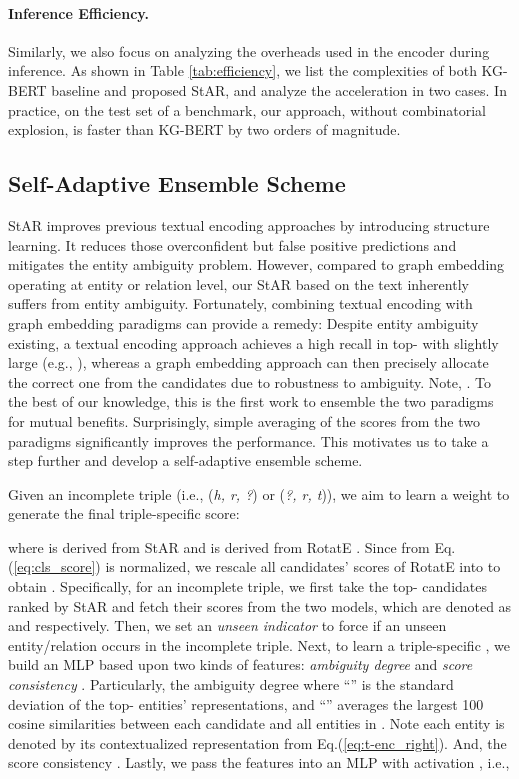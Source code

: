 \documentclass[sigconf]{acmart}
\begin{document}
\paragraph{Inference Efficiency.}
Similarly, we also focus on analyzing the overheads used in the encoder during inference. 
As shown in Table \ref{tab:efficiency}, we list the complexities of both KG-BERT baseline and proposed StAR, and analyze the acceleration in two cases. 
In practice, on the test set of a benchmark, our approach, without combinatorial explosion, is faster than KG-BERT by two orders of magnitude. 


\subsection{Self-Adaptive Ensemble Scheme} \label{subsec:adaptive model}
StAR improves previous textual encoding approaches by introducing structure learning. It reduces those overconfident but false positive predictions and mitigates the entity ambiguity problem. 
However, compared to graph embedding operating at entity or relation level, our StAR based on the text inherently suffers from entity ambiguity. 
Fortunately, combining textual encoding with graph embedding paradigms can provide a remedy: 
Despite entity ambiguity existing, a textual encoding approach achieves a high recall in top- with slightly large  (e.g., ), whereas a graph embedding approach can then precisely allocate the correct one from the  candidates due to robustness to ambiguity. Note, .
To the best of our knowledge, this is the first work to ensemble the two paradigms for mutual benefits. 
Surprisingly, simple averaging of the scores from the two paradigms significantly improves the performance. 
This motivates us to take a step further and develop a self-adaptive ensemble scheme. 

Given an incomplete triple (i.e., (\textit{h, r, ?}) or (\textit{?, r, t})), we aim to learn a weight  to generate the final triple-specific score: 

where  is derived from StAR and  is derived from RotatE \cite{sun2019rotate}. Since  from Eq.(\ref{eq:cls_score}) is normalized, we rescale all candidates' scores of RotatE into  to obtain .
Specifically, for an incomplete triple, we first take the top- candidates ranked by StAR and fetch their scores from the two models, which are denoted as  and  respectively. 
Then, we set an \textit{unseen indicator} to force  if an unseen entity/relation occurs in the incomplete triple. 
Next, to learn a triple-specific , we build an MLP based upon two kinds of features: \textit{ambiguity degree}  and \textit{score consistency} . 
Particularly, the ambiguity degree  where ``'' is the standard deviation of the top- entities' representations, and ``'' averages the largest 100 cosine similarities between each candidate and all entities in . 
Note each entity is denoted by its contextualized representation from Eq.(\ref{eq:t-enc_right}). And, the score consistency . 
Lastly, we pass the features into an MLP with activation , i.e., 
\end{document}
